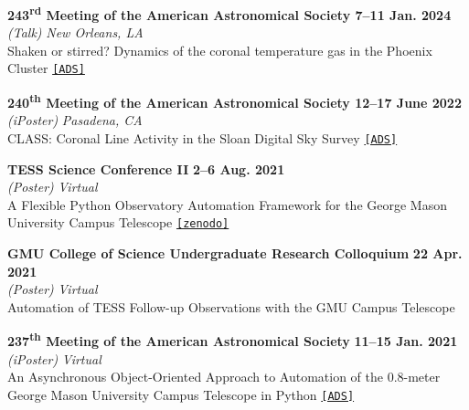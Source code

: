 \documentclass[marg, centered]{res}
\begin{document}
\begin{resume}
\begin{etaremune}
\item \textbf{243\textsuperscript{rd} Meeting of the American Astronomical Society \hfill \textbf{7--11 Jan. 2024}}\\
\textit{(Talk)} \hfill \textit{New Orleans, LA}\\
Shaken or stirred? Dynamics of the coronal temperature gas in the Phoenix Cluster
\href{https://ui.adsabs.harvard.edu/abs/2024AAS...24344204R/abstract}{\texttt{[ADS]}}
    
\item \textbf{240\textsuperscript{th} Meeting of the American Astronomical Society \hfill \textbf{12--17 June 2022}}\\
\textit{(iPoster)} \hfill \textit{Pasadena, CA}\\
CLASS: Coronal Line Activity in the Sloan Digital Sky Survey \href{https://ui.adsabs.harvard.edu/abs/2022AAS...24010113R/abstract}{\texttt{[ADS]}}

\item \textbf{TESS Science Conference II} \hfill \textbf{2--6 Aug. 2021}\\
\textit{(Poster)} \hfill \textit{Virtual}\\
A Flexible Python Observatory Automation Framework for the George Mason\\ University Campus Telescope \href{https://zenodo.org/record/5115310}{\texttt{[zenodo]}}

\item \textbf{GMU College of Science Undergraduate Research Colloquium} \hfill \textbf{22 Apr. 2021}\\
\textit{(Poster)} \hfill \textit{Virtual}\\
Automation of TESS Follow-up Observations with the GMU Campus Telescope

\item \textbf{237\textsuperscript{th} Meeting of the American Astronomical Society} \hfill \textbf{11--15 Jan. 2021}\\
\textit{(iPoster)} \hfill \textit{Virtual}\\
An Asynchronous Object-Oriented Approach to Automation of the 0.8-meter\\ George Mason University Campus Telescope in Python \href{https://ui.adsabs.harvard.edu/abs/2021AAS...23734407R/abstract}{\texttt{[ADS]}}




\end{etaremune}
\end{resume}
\end{document}
